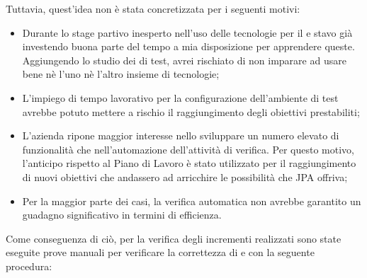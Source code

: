 Tuttavia, quest'idea non è stata concretizzata per i seguenti motivi:

\begin{itemize}
\item Durante lo stage partivo inesperto nell'uso delle tecnologie per il
  \FREND{} e stavo già investendo buona parte del tempo a mia disposizione per
  apprendere queste. Aggiungendo lo studio dei  di test, avrei
  rischiato di non imparare ad usare bene nè l'uno nè l'altro insieme di
  tecnologie;
\item L'impiego di tempo lavorativo per la configurazione dell'ambiente di
  test avrebbe potuto mettere a rischio il raggiungimento degli obiettivi
  prestabiliti;
\item L'azienda ripone maggior interesse nello sviluppare un numero elevato di
  funzionalità che nell'automazione dell'attività di verifica. Per questo
  motivo, l'anticipo rispetto al Piano di Lavoro è stato utilizzato per il
  raggiungimento di nuovi obiettivi che andassero ad arricchire le possibilità
  che JPA offriva;
\item Per la maggior parte dei casi, la verifica automatica non avrebbe
  garantito un guadagno significativo in termini di efficienza.
\end{itemize}

Come conseguenza di ciò, per la verifica degli incrementi realizzati sono state
eseguite prove manuali per verificare la correttezza di \BKEND{} e \FREND{}
con la seguente procedura:

